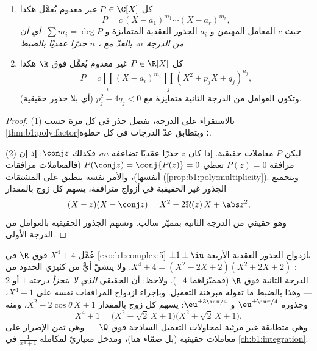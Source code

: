 \begin{corollary}\label{cor:b1:poly:factorization}
\begin{enumerate}
  \item كل $P \in \C[X]$ غير معدوم يُعمَّل هكذا
        \[
        P = c\, (X - a_1)^{m_1} \cdots (X - a_r)^{m_r},
        \]
        حيث $c$ المعامل المهيمن و $a_i$ الجذور العقدية المتمايزة
        و $\sum m_i = \deg P$: \emph{أي أن  من الدرجة $n$،
        بالعدّ مع ، $n$ جذرًا عقديًا بالضبط}.
  \item كل $P \in \R[X]$ غير معدوم يُعمَّل فوق $\R$ هكذا
        \[
        P = c \prod_i (X - a_i)^{m_i} \prod_j (X^2 + p_j X +
        q_j)^{n_j},
        \]
        وتكون العوامل من الدرجة الثانية متمايزة مع $p_j^2 - 4q_j < 0$
        (أي بلا جذور حقيقية).
\end{enumerate}
\end{corollary}

\begin{proof}
(1) بالاستقراء على الدرجة، بفصل جذر في كل مرة حسب
\cref{thm:b1:poly:factor}؛ ويتطابق عدّ الدرجات في كل خطوة.

(2) ليكن  $P$ معاملات حقيقية. إذا كان $z$ جذرًا عقديًا
تضاعفه $m$، فكذلك $\conj z$: إذ إن مرافقة $P(z) = 0$ تعطي
$P(\conj z) = \conj{P(z)} = 0$ (فالمعاملات مرافقات أنفسها)،
والأمر نفسه ينطبق على المشتقات
(\cref{prop:b1:poly:multiplicity}). وبتجميع الجذور غير الحقيقية في
أزواج مترافقة، يسهم كل زوج بالمقدار \[
(X - z)(X - \conj z) = X^2 - 2\Re(z)\, X + \abs z^2 ,
\]
وهو  حقيقي من الدرجة الثانية بمميّز سالب. وتسهم الجذور الحقيقية
بالعوامل من الدرجة الأولى.
\end{proof}

\begin{example}\label{ex:b1:poly:factorexample}
عُمِّل $X^4 + 4$ فوق $\R$ في \cref{exo:b1:complex:5} بازدواج
الجذور العقدية الأربعة $\pm 1 \pm \iu$:
$X^4 + 4 = (X^2 - 2X + 2)(X^2 + 2X + 2)$. ولا ينشقّ أيٌّ من كثيرَي الحدود من الدرجة الثانية
فوق $\R$ (فمميّزاهما $-4$). ولاحظ: أن  الحقيقي
\emph{الذي لا يتجزأ} درجته $1$ أو $2$ --- وهذا بالضبط ما تقوله
مبرهنة التعميل. وبإجراء ازدواج المرافقات نفسه على
$X^4 + 1$، وجذوره $\eu^{\pm\iu\pi/4}$ و
$\eu^{\pm3\iu\pi/4}$: يسهم كل زوج بالمقدار $X^2 -
2\cos\theta\,X + 1$، ومنه
\[
X^4 + 1 = \bigl(X^2 - \sqrt2\,X + 1\bigr)
\bigl(X^2 + \sqrt2\,X + 1\bigr) ,
\]
وهي متطابقة غير مرئية لمحاولات التعميل الساذجة فوق $\Q$ ---
وهي ثمن الإصرار على معاملات حقيقية (بل صمّاء هنا)،
ومدخل معياريّ لمكاملة $\frac1{x^4 +
1}$ في \cref{ch:b1:integration}.
\end{example}

